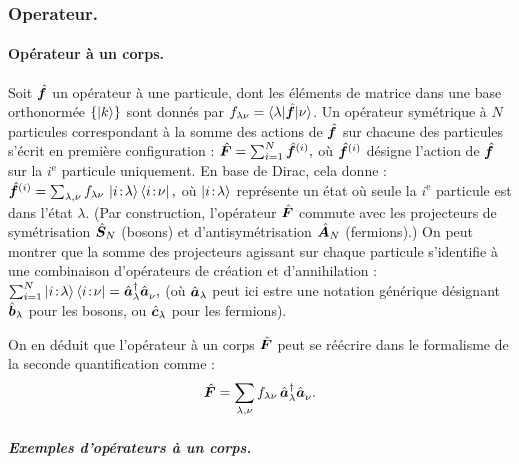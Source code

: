\subsubsection{Operateur. }


\paragraph{Opérateur à un corps.}

Soit \( \hat{\bm{f}} \) un opérateur à une particule, dont les éléments de matrice dans une base orthonormée \( \{ \ket{k} \} \) sont donnés par \( f_{\lambda\nu} = \langle \lambda \vert \hat{\bm{f}} \vert \nu \rangle \). Un opérateur symétrique à \( N \) particules correspondant à la somme des actions de \( \hat{\bm{f}} \) sur chacune des particules s’écrit en première configuration  :
\(
	\hat{\bm{F}} = \sum_{i=1}^N \hat{\bm{f}}^{(i)},
\)
où \( \hat{\bm{f}}^{(i)} \) désigne l’action de \( \hat{\bm{f}} \) sur la $i^\text{e}$ particule uniquement. En base de Dirac, cela donne :
\(
	\hat{\bm{f}}^{(i)} = \sum_{\lambda, \nu} f_{\lambda\nu} \, \ket{i\!:\!\lambda} \bra{i\!:\!\nu},
\)
où \( \ket{i\!:\!\lambda} \) représente un état où seule la $i^\text{e}$ particule est dans l’état \( \lambda \). (Par construction, l’opérateur \( \hat{\bm{F}} \) commute avec les projecteurs de symétrisation \( \hat{\bm{S}}_N \) (bosons) et d’antisymétrisation \( \hat{\bm{A}}_N \) (fermions).)
On peut montrer que la somme des projecteurs agissant sur chaque particule s’identifie à une combinaison d’opérateurs de création et d’annihilation :
\(
	\sum_{i=1}^N \ket{i\!:\!\lambda} \bra{i\!:\!\nu} = \hat{\bm{a}}^\dagger_\lambda \hat{\bm{a}}_\nu^{},
\)
(où \( \hat{\bm{a}}_\lambda \) peut ici estre une notation générique désignant \( \hat{\bm{b}}_\lambda \) pour les bosons, ou \( \hat{\bm{c}}_\lambda \) pour les fermions).

On en déduit que l’opérateur à un corps \( \hat{\bm{F}} \) peut se réécrire dans le formalisme de la seconde quantification comme :
\begin{eqnarray}
	\hat{\bm{F}} = \sum_{\lambda, \nu} f_{\lambda\nu} \, \hat{\bm{a}}^\dagger_\lambda \hat{\bm{a}}_\nu^{}.
\end{eqnarray}


\subparagraph{Exemples d’opérateurs à un corps.}

